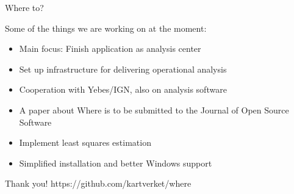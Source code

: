\documentclass[ignorenonframetext,12pt,t]{beamer}
\begin{document}
\begin{frame}{Where to?}

  \begin{centering}
    Some of the things we are working on at the moment:
  \end{centering}
  \pause
  
  \begin{itemize}
  \item<2-> Main focus: Finish application as analysis center
  \item<3-> Set up infrastructure for delivering operational analysis
  \item<4-> Cooperation with Yebes/IGN, also on analysis software
  \item<5-> A paper about Where is to be submitted to the Journal of Open Source Software
  \item<6-> Implement least squares estimation
  \item<7-> Simplified installation and better Windows support
  \end{itemize}
\end{frame}

\begin{frame}[c]{Thank you!}
  \LARGE https://github.com/kartverket/where
\end{frame}
  
\end{document}
